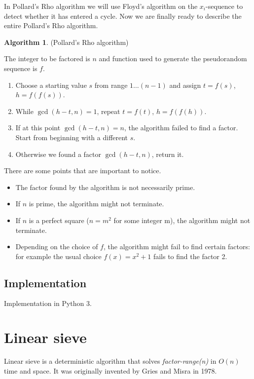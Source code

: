 \documentclass[12pt] {article}
\theoremstyle{plain}
\theoremstyle{definition}
\newtheorem{algo}[thm]{Algorithm}
\begin{document}
In Pollard's Rho algorithm we will use Floyd's algorithm on the $x_i$-sequence to detect whether it has entered a cycle. Now we are finally ready to describe the entire Pollard's Rho algorithm.

\begin{algo} (Pollard's Rho algorithm)

The integer to be factored is $n$ and function used to generate the pseudorandom sequence is $f$.
\begin{enumerate}
\item Choose a starting value $s$ from range $1 \dots (n-1)$ and assign $t = f(s)$, $h = f(f(s))$.
\item While $\gcd(h-t, n) = 1$, repeat $t = f(t)$, $h = f(f(h))$.
\item If at this point $\gcd(h-t, n) = n$, the algorithm failed to find a factor. Start from beginning with a different $s$.
\item Otherwise we found a factor $\gcd(h-t, n)$, return it.
\end{enumerate}
\end{algo}

There are some points that are important to notice.

\begin{itemize}
\item The factor found by the algorithm is not necessarily prime.
\item If $n$ is prime, the algorithm might not terminate.
\item If $n$ is a perfect square ($n = m^2$ for some integer m), the algorithm might not terminate.
\item Depending on the choice of $f$, the algorithm might fail to find certain factors: for example the usual choice $f(x) = x^2 + 1$ fails to find the factor 2\cite{pollardfail}.
\end{itemize}

\subsection {Implementation}

Implementation in Python 3.



\section {Linear sieve}

Linear sieve is a deterministic algorithm that solves \textit{factor-range(n)} in $O(n)$ time and space. It was originally invented by Gries and Misra in 1978\cite{gries}.
\end{document}
